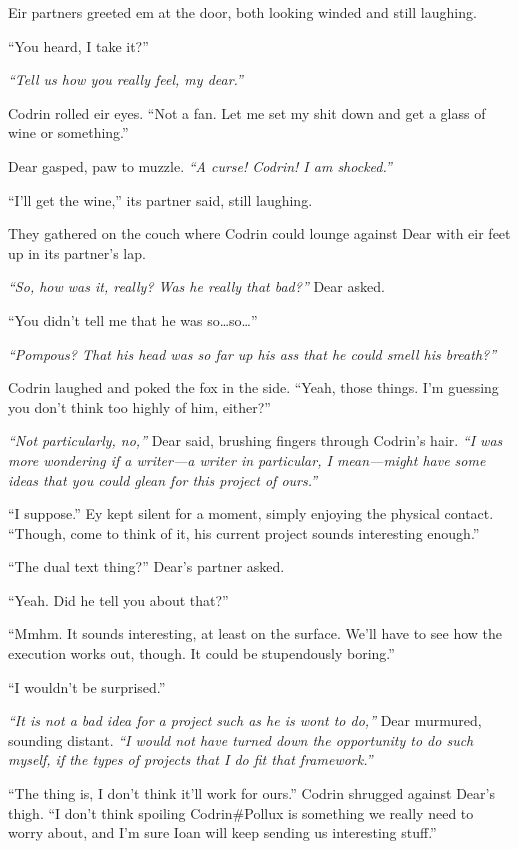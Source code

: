 Eir partners greeted em at the door, both looking winded and still laughing.

``You heard, I take it?''

\emph{``Tell us how you really feel, my dear.''}

Codrin rolled eir eyes. ``Not a fan. Let me set my shit down and get a glass of wine or something.''

Dear gasped, paw to muzzle. \emph{``A curse! Codrin! I am shocked.''}

``I'll get the wine,'' its partner said, still laughing.

They gathered on the couch where Codrin could lounge against Dear with eir feet up in its partner's lap.

\emph{``So, how was it, really? Was he really that bad?''} Dear asked.

``You didn't tell me that he was so\ldots so\ldots{}''

\emph{``Pompous? That his head was so far up his ass that he could smell his breath?''}

Codrin laughed and poked the fox in the side. ``Yeah, those things. I'm guessing you don't think too highly of him, either?''

\emph{``Not particularly, no,''} Dear said, brushing fingers through Codrin's hair. \emph{``I was more wondering if a writer---a writer in particular, I mean---might have some ideas that you could glean for this project of ours.''}

``I suppose.'' Ey kept silent for a moment, simply enjoying the physical contact. ``Though, come to think of it, his current project sounds interesting enough.''

``The dual text thing?'' Dear's partner asked.

``Yeah. Did he tell you about that?''

``Mmhm. It sounds interesting, at least on the surface. We'll have to see how the execution works out, though. It could be stupendously boring.''

``I wouldn't be surprised.''

\emph{``It is not a bad idea for a project such as he is wont to do,''} Dear murmured, sounding distant. \emph{``I would not have turned down the opportunity to do such myself, if the types of projects that I do fit that framework.''}

``The thing is, I don't think it'll work for ours.'' Codrin shrugged against Dear's thigh. ``I don't think spoiling Codrin\#Pollux is something we really need to worry about, and I'm sure Ioan will keep sending us interesting stuff.''

